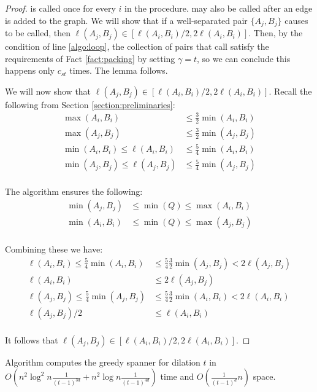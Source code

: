 \documentclass[runningheads,envcountsame,oribibl,orivec]{llncs}
\begin{document}
\begin{proof}
 is called once for every $i$ in the  procedure.  may also be called after an edge is added to the graph. We will show that if a well-separated pair $\{ A_j, B_j \}$ causes  to be called, then $\ell(A_j, B_j) \in [\ell(A_i, B_i)/2, 2\ell(A_i, B_i)]$. Then, by the condition of line \ref{algo:loop}, the collection of pairs that call  satisfy the requirements of Fact \ref{fact:packing} by setting $\gamma = t$, so we can conclude this happens only $c_{s t}$ times. The lemma follows.

We will now show that $\ell(A_j, B_j) \in [\ell(A_i, B_i)/2, 2\ell(A_i, B_i)]$. Recall the following from Section \ref{section:preliminaries}:
\begin{align*}
\max(A_i, B_i) &\leq \frac{3}{2} \min(A_i, B_i) \\
\max(A_j, B_j) &\leq \frac{3}{2} \min(A_j, B_j) \\
\min(A_i, B_i) \leq \ell(A_i, B_i) &\leq \frac{5}{4} \min(A_i, B_i) \\
\min(A_j, B_j) \leq \ell(A_j, B_j) &\leq \frac{5}{4} \min(A_j, B_j) \\
\end{align*}

The algorithm ensures the following:
\begin{align*}
\min(A_j, B_j) &\leq \min(Q) \leq \max(A_i, B_i)\\
\min(A_i, B_i) &\leq \min(Q) \leq \max(A_j, B_j)\\
\end{align*}

Combining these we have:
\begin{align*}
\ell(A_i, B_i) \leq \frac{5}{4} \min(A_i, B_i) &\leq \frac{5}{4} \frac{3}{2} \min(A_j, B_j) < 2 \ell(A_j, B_j)\\
\ell(A_i, B_i) &\leq 2 \ell(A_j, B_j) \\
\ell(A_j, B_j) \leq \frac{5}{4} \min(A_j, B_j) &\leq \frac{5}{4} \frac{3}{2} \min(A_i, B_i) < 2 \ell(A_i, B_i)\\
\ell(A_j, B_j) / 2 &\leq \ell(A_i, B_i) \\
\end{align*}

It follows that $\ell(A_j, B_j) \in [\ell(A_i, B_i)/2, 2\ell(A_i, B_i)]$.
\end{proof}

\begin{theorem} \label{theorem:full}
Algorithm  computes the greedy spanner for dilation $t$ in $O\left(n^2 \log^2 n \frac{1}{(t-1)^{3d}}+ n^2 \log n \frac{1}{(t-1)^{4d}}\right)$ time and $O\left(\frac{1}{(t-1)^d} n\right)$ space.
\end{theorem}
\end{document}
